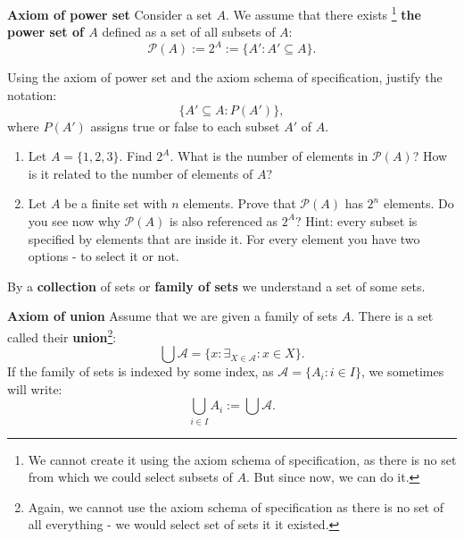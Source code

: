 \begin{definition}
  \textbf{Axiom of power set} Consider a set $A$. We assume that there exists
  \footnote{We cannot create it using the axiom schema of specification, as there is no set from which we could select subsets of $A$. But since now, we can do it.}
  \textbf{the power set of $A$} defined as a set of all subsets of $A$:
  $$\mathcal P(A) := 2^A := \{A' : A'\subseteq A\}.$$
\end{definition}

\begin{exercise}
  Using the axiom of power set and the axiom schema of specification, justify the notation:
  $$\{A'\subseteq A : P(A')\},$$
  where $P(A')$ assigns true or false to each subset $A'$ of $A$.
\end{exercise}

\begin{exercise}
  \begin{enumerate}
    \item Let $A=\{1,2,3\}$. Find $2^A$. What is the number of elements in $\mathcal P(A)$? How is it related to the
      number of elements of $A$?
    \item Let $A$ be a finite set with $n$ elements. Prove that $\mathcal P(A)$ has $2^n$ elements.
      Do you see now why $\mathcal P(A)$ is also referenced as $2^A$?
      Hint: every subset is specified by elements that are inside it.
      For every element you have two options - to select it or not.
  \end{enumerate}
\end{exercise}

\begin{definition}
  By a \textbf{collection} of sets or \textbf{family of sets} we understand a set of some sets.
\end{definition}

\begin{definition}
  \textbf{Axiom of union} Assume that we are given a family of sets $A$. There is a set called their \textbf{union}\footnote{Again, we cannot use the axiom schema of specification as there is no
  set of all everything - we would select set of sets it it existed.}:
  $$\bigcup \mathcal A = \{x : \exists_{X\in \mathcal A} : x\in X\}.$$
  If the family of sets is indexed by some index, as $\mathcal A = \{A_i : i\in I\}$, we sometimes will write:
  $$\bigcup_{i\in I} A_i := \bigcup \mathcal A.$$
\end{definition}

